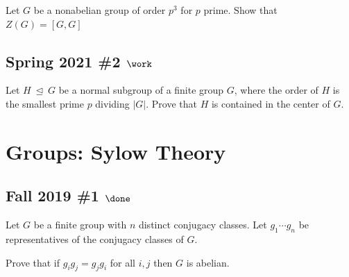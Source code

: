 Let \(G\) be a nonabelian group of order \(p^3\) for \(p\) prime. Show
that \(Z(G) = [G, G]\)

\hypertarget{spring-2021-2-work}{%
\subsection{\texorpdfstring{Spring 2021 \#2
\(\work\)}{Spring 2021 \#2 \textbackslash work}}\label{spring-2021-2-work}}

Let \(H {~\trianglelefteq~}G\) be a normal subgroup of a finite group
\(G\), where the order of \(H\) is the smallest prime \(p\) dividing
\({\left\lvert {G} \right\rvert}\). Prove that \(H\) is contained in the
center of \(G\).

\hypertarget{groups-sylow-theory}{%
\section{Groups: Sylow Theory}\label{groups-sylow-theory}}

\hypertarget{fall-2019-1-done}{%
\subsection{\texorpdfstring{Fall 2019 \#1
\(\done\)}{Fall 2019 \#1 \textbackslash done}}\label{fall-2019-1-done}}

Let \(G\) be a finite group with \(n\) distinct conjugacy classes. Let
\(g_1 \cdots g_n\) be representatives of the conjugacy classes of \(G\).

Prove that if \(g_i g_j = g_j g_i\) for all \(i, j\) then \(G\) is
abelian.


